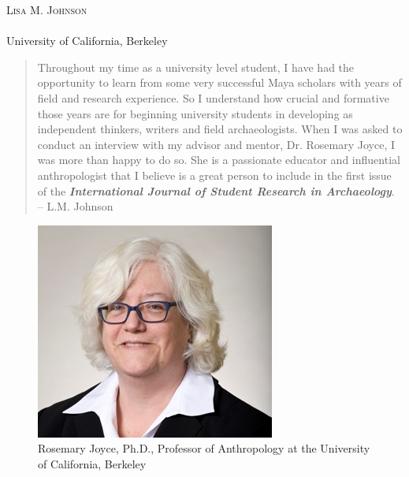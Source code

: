 \openingarticle
\def\ppages{\pagerange{Johnson:firstpage}{Johnson:lastpage}}
\def\shorttitle{Interview: Rosemary Joyce}
\def\shortauthor{Lisa M. Johnson}
\def\authormail{llomitola@berkeley.edu}
\def\maintitle{Rosemary Joyce, Ph.D. \textit{Professor of Anthropology at the University of California, Berkeley}}
\def\affiliation{University of California, Berkeley}
\begin{center}
	{\Large\scshape\shortauthor}\\[1em]
	\email \\
	\affiliation
\end{center}
\vspace{3em}
\midarticle
 \label{Johnson:firstpage}
 	

\blockquote{Throughout my time as a university level student, I have had the opportunity to learn from some very successful Maya scholars with years of field and research experience.  So I understand how crucial and formative those years are for beginning university students in developing as independent thinkers, writers and field archaeologists.  When I was asked to conduct an interview with my advisor and mentor, Dr. Rosemary Joyce, I was more than happy to do so.  She is a passionate educator and influential anthropologist that I believe is a great person to include in the first issue of the \textbf{\textit{International Journal of Student Research in Archaeology}}. -- L.M. Johnson}	
	
	\begin{figure}
		\includegraphics[width=.75\linewidth]{figures/johnson_fig1}
		\centering
		\caption{Rosemary Joyce, Ph.D., Professor of Anthropology at the University of California, Berkeley}
		\label{fig:Johnson:Fig1}
	\end{figure}
	
